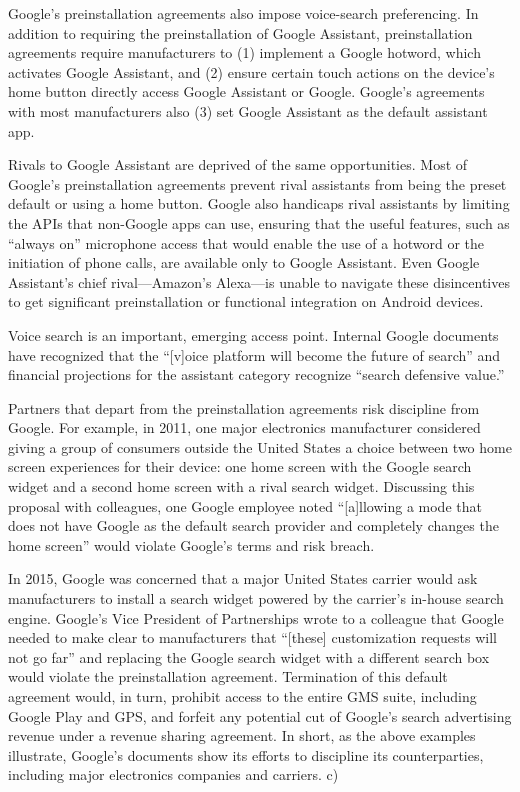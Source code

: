 \documentclass[11pt,b5paper]{scrartcl}
\begin{document}

Google’s preinstallation agreements also impose voice-search preferencing. In
addition to requiring the preinstallation of Google Assistant, preinstallation agreements require
manufacturers to (1) implement a Google hotword, which activates Google Assistant, and
(2) ensure certain touch actions on the device’s home button directly access Google Assistant or
Google. Google’s agreements with most manufacturers also (3) set Google Assistant as the
default assistant app.


Rivals to Google Assistant are deprived of the same opportunities. Most of
Google’s preinstallation agreements prevent rival assistants from being the preset default or
using a home button. Google also handicaps rival assistants by limiting the APIs that non-Google
apps can use, ensuring that the useful features, such as “always on” microphone access that
would enable the use of a hotword or the initiation of phone calls, are available only to Google
Assistant. Even Google Assistant’s chief rival—Amazon’s Alexa—is unable to navigate these
disincentives to get significant preinstallation or functional integration on Android devices.


Voice search is an important, emerging access point. Internal Google documents
have recognized that the “[v]oice platform will become the future of search” and financial
projections for the assistant category recognize “search defensive value.”


Partners that depart from the preinstallation agreements risk discipline from
Google. For example, in 2011, one major electronics manufacturer considered giving a group of
consumers outside the United States a choice between two home screen experiences for their
device: one home screen with the Google search widget and a second home screen with a rival
search widget. Discussing this proposal with colleagues, one Google employee noted “[a]llowing
a mode that does not have Google as the default search provider and completely changes the
home screen” would violate Google’s terms and risk breach.


In 2015, Google was concerned that a major United States carrier would ask
manufacturers to install a search widget powered by the carrier’s in-house search engine.
Google’s Vice President of Partnerships wrote to a colleague that Google needed to make clear
to manufacturers that “[these] customization requests will not go far” and replacing the Google
search widget with a different search box would violate the preinstallation agreement.
Termination of this default agreement would, in turn, prohibit access to the entire GMS suite,
including Google Play and GPS, and forfeit any potential cut of Google’s search advertising
revenue under a revenue sharing agreement. In short, as the above examples illustrate, Google’s
documents show its efforts to discipline its counterparties, including major electronics companies
and carriers.
c)
\end{document}
